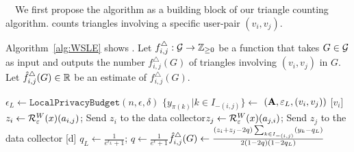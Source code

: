 {}~~We first
propose
the \AlgWSLE{} algorithm
as a building block of our triangle counting algorithm.
\AlgWSLE{} counts
triangles involving a specific user-pair $(v_i,v_j)$.

Algorithm~\ref{alg:WSLE} shows \AlgWSLE{}.
Let $f_{i,j}^\triangle: \mathcal{G} \rightarrow \mathbb{Z}_{\ge0}$ be a function that takes $G \in \mathcal{G}$ as input and outputs the number $f_{i,j}^\triangle(G)$ of triangles involving $(v_i,v_j)$ in $G$.
Let $\hat{f}_{i,j}^\triangle(G) \in \mathbb{R}$ be an estimate of $f_{i,j}^\triangle(G)$.

\setlength{\algomargin}{5mm}
\begin{algorithm}[t]
  \SetAlgoLined
  $\epsilon_L \leftarrow \texttt{LocalPrivacyBudget}(n,\epsilon,\delta)$\;
  $\{y_{\pi(k)} | k \in I_{-(i,j)}\} \leftarrow$ \AlgWS{}$(\mathbf{A}, \varepsilon_L, (v_i, v_j))$\;
  [$v_i$] $z_i \leftarrow \mathcal{R}_{\varepsilon}^W(x)(a_{i,j})$; Send $z_i$ to the data collector\;
  [$v_j$] $z_j \leftarrow \mathcal{R}_{\varepsilon}^W(x)(a_{j,i})$; Send $z_j$ to the data collector\;
  [d] $q_L \leftarrow \frac{1}{e^{\epsilon_L}+1}$; $q \leftarrow
  \frac{1}{e^\epsilon+1}$\;
  [d] $\hat{f}_{i,j}^\triangle(G) \leftarrow \frac{(z_i+z_j-2q)\sum_{k \in
  I_{-(i,j)}} (y_{k} - q_L)}{2(1-2q)(1-2q_L)}$\;
  [d] 
  \caption{\AlgWSLE{}
  (Wedge Shuffling with Local Edges).
  \AlgWS{} is shown in Algorithm~\ref{alg:WShuffle}.
  }\label{alg:WSLE}
\end{algorithm}

